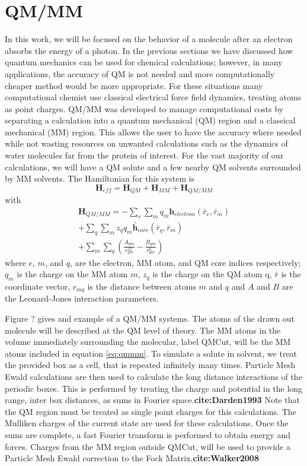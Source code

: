 \section{QM/MM}
    In this work, we will be focused on the behavior of a molecule after an electron absorbs the energy of a photon.
    In the previous sections we have discussed how quantum mechanics can be used for chemical calculations;
    however, in many applications, the accuracy of QM is not needed and more computationally cheaper method would be more appropriate.
    For these situations many computational chemist use classical electrical force field dynamics, treating atoms as point charges.
    QM/MM was developed to manage computational costs by separating a calculation into a quantum mechanical (QM) region and a classical mechanical (MM) region.\cite{Karplus2014}
    This allows the user to have the accuracy where needed while not wasting resources on unwanted calculations such as the dynamics of water molecules far from the protein of interest.
    For the vast majority of our calculations, we will have a QM solute and a few nearby QM solvents surrounded by MM solvents.
    The Hamiltonian for this system is 
    \begin{equation}
     \mathbf{H}_{eff}=\mathbf{H}_{QM}+\mathbf{H}_{MM}+\mathbf{H}_{QM/MM} 
    \end{equation}
    with
    \begin{align}\label{eq:qmmm}
      \mathbf{H}_{QM/MM}=-\sum_{e}\sum_mq_m\mathbf{h}_{electron}(\bar{r}_e,\bar{r}_m)\\
      +\sum_q\sum_mz_qq_m\bar{\mathbf{h}}_{core}(\bar{r}_q,\bar{r}_m)\\
      +\sum_m\sum_q\left( \frac{A_{qm}}{r_{qm}^{12}}-\frac{B_{qm}}{r_{qm}^6} \right)
    \end{align}
    where $e$, $m$, and $q$, are the electron, MM atom, and QM core indices respectively;
    $q_m$ is the charge on the MM atom $m$, $z_q$ is the charge on the QM atom q, $\bar{r}$ is the coordinate vector, $r_{mq}$ is the distance between atoms $m$ and $q$ and $A$ and $B$ are the Leonard-Jones interaction parameters.\cite{Walker2008}

    Figure ? gives and example of a QM/MM systems.
    The atoms of the drawn out molecule will be described at the QM level of theory.
    The MM atoms in the volume immediately surrounding the molecular, label QMCut, will be the MM atoms included in equation \ref{eq:qmmm}.
    To simulate a solute in solvent, we treat the provided box as a cell, that is repeated infinitely many times.
    Particle Mesh Ewald calculations are then used to calculate the long distance interactions of the periodic boxes.
    This is performed by treating the charge and potential in the long range, inter box distances, as sums in Fourier space.\textbf{cite:Darden1993}
    Note that the QM region must be treated as single point charges for this calculations.
    The Mulliken charges of the current state are used for these calculations.
    Once the sums are complete, a fast Fourier transform is performed to obtain energy and forces.
    Charges from the MM region outside QMCut, will be used to provide a Particle Mesh Ewald correction to the Fock Matrix.\textbf{cite:Walker2008}

